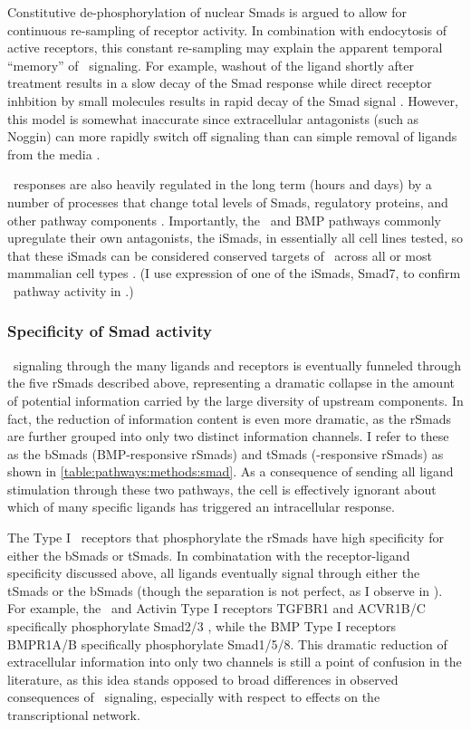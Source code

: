 Constitutive de-phosphorylation of nuclear
Smads is argued to allow for continuous re-sampling of receptor activity.
In combination with endocytosis of active receptors, this constant
re-sampling may explain the
apparent temporal ``memory'' of \tgfbsf\ signaling. For example,
washout of the ligand shortly after treatment results in a slow decay of the Smad
response while direct receptor inhbition by small molecules results in
rapid decay of the Smad signal \cite{Inman2002b}.
However, this model is somewhat inaccurate since
extracellular antagonists (such as Noggin) can more
rapidly switch off signaling than can simple removal of ligands
from the media \cite{Schmierer2007}.


\tgfbsf\ responses are also heavily regulated in the long term (hours and days)
by a number of processes that change total levels of Smads,
regulatory proteins, and other pathway components \cite{Lonn2009}.
Importantly, the \tgf\ and BMP pathways commonly upregulate their own antagonists,
the iSmads, in essentially all cell lines tested, so that
these iSmads can be considered conserved targets of \tgfbsf\ across
all or most mammalian cell types \cite{Derynck2003,Massague2012}.
(I use expression of one of the iSmads, Smad7, to confirm \tgfbsf\
pathway activity in .)


\subsubsection{Specificity of Smad activity}

 
\tgfbsf\ signaling through the many ligands and receptors is eventually
funneled through the five rSmads described above, representing
a dramatic collapse in the amount of potential information carried by the
large diversity of upstream components. In fact, the reduction of information content
is even more dramatic, as the rSmads are further grouped into only two
distinct information channels. I refer to these as the bSmads (BMP-responsive
rSmads) and tSmads (\tgf-responsive rSmads) as shown in
\autoref{table:pathways:methods:smad}. As a consequence of sending all
ligand stimulation through these two pathways, the cell is effectively
ignorant about which of many specific ligands has triggered an
intracellular response.


The Type I \tgfbsf\ receptors that
phosphorylate the rSmads have high specificity for either the bSmads or tSmads.
In combinatation with the receptor-ligand specificity discussed above, all
ligands eventually signal through either the tSmads or the bSmads
(though the separation is not perfect, as I observe in ).
For example, the \tgf\ and Activin Type I receptors TGFBR1 and ACVR1B/C
specifically phosphorylate Smad2/3 \cite{Dijke2004}, while the BMP Type I
receptors BMPR1A/B specifically phosphorylate Smad1/5/8. This dramatic
reduction of extracellular information into only two channels is still a point of
confusion in the literature, as this idea stands opposed to broad differences in
observed consequences of \tgfbsf\ signaling, especially with respect to
effects on the transcriptional network.


